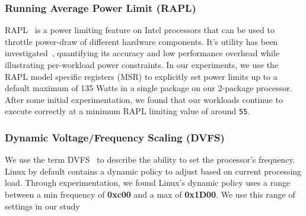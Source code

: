 \subsubsection{Running Average Power Limit (RAPL)}
\label{sec:knobs_rapl}
RAPL~\cite{intel_rapl} is a power limiting feature on Intel processors
that can be used to throttle power-draw of different hardware components.
It's utility has been investigated~\cite{rapl2015, rapl2018, PerAppPower},
quantifying its accuracy and low performance overhead
while illustrating per-workload power constraints.
In our experiments, we use the RAPL model specific registers (MSR) to explicitly set power limits up to a default maximum of 135 Watts
in a single package on our 2-package processor. After some initial experimentation, we
found that our workloads continue to execute correctly at a minimum RAPL limiting value of around \texttt{55}.


\subsubsection{Dynamic Voltage/Frequency Scaling (DVFS)}
\label{sec:knobs_dvfs}
We use the term DVFS~\cite{cpufreq_governor} to describe the ability to set the processor's frequency.
Linux by default contains a dynamic policy to adjust based on current processing load.
Through experimentation, we found Linux's dynamic policy uses a range between
a min frequency of \textbf{0xc00} and a max of \textbf{0x1D00}. We use this range of settings in our study

